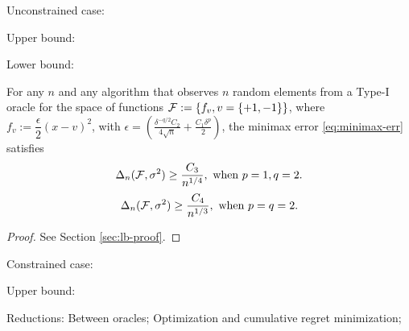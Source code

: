 
Unconstrained case:

Upper bound: 

Lower bound:
\begin{theorem}
 For any $n$ and any algorithm that observes $n$ random elements from a Type-I oracle for the space of functions $\mathcal{F}:=\{f_v, v=\{+1,-1\}\}$, where $f_v:= \dfrac{\epsilon}{2} (x - v)^2$, with $\epsilon = \left(\frac{\delta^{-q/2}C_2}{4\sqrt{n}} + \frac{C_1\delta^p}{2}\right)$, the minimax error \eqref{eq:minimax-err} satisfies
$$\Delta_n(\mathcal{F}, \sigma^2) \ge \dfrac{C_3}{ n^{1/4}}, \text{ when } p=1, q=2.$$
 $$\Delta_n(\mathcal{F}, \sigma^2) \ge \dfrac{C_4}{ n^{1/3}},  \text{ when } p=q=2.$$
\end{theorem}
\begin{proof}
 See Section \ref{sec:lb-proof}.
\end{proof}


Constrained case:

Upper bound: 

Reductions:
Between oracles;
Optimization and cumulative regret minimization;


